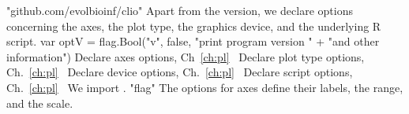 "github.com/evolbioinf/clio"
\nwendcode{}\nwdocspar
Apart from the version, we declare options concerning the axes, the
plot type, the graphics device, and the underlying R script.
\nwenddocs{}\endmoddef\nwstartdeflinemarkup{}\nwenddeflinemarkup
var optV = flag.Bool("v", false, "print program version " +
          "and other information")
\LA{}Declare axes options, Ch~\ref{ch:pl}~{\nwtagstyle{}}\RA{}
\LA{}Declare plot type options, Ch.~\ref{ch:pl}~{\nwtagstyle{}}\RA{}
\LA{}Declare device options, Ch.~\ref{ch:pl}~{\nwtagstyle{}}\RA{}
\LA{}Declare script options, Ch.~\ref{ch:pl}~{\nwtagstyle{}}\RA{}
\nwendcode{}\nwdocspar
We import .
\nwenddocs{}\plusendmoddef\nwstartdeflinemarkup{}\nwenddeflinemarkup
"flag"
\nwendcode{}\nwdocspar
The options for axes define their labels, the range, and the scale.
\nwenddocs{}\endmoddef\nwstartdeflinemarkup{}\nwenddeflinemarkup
